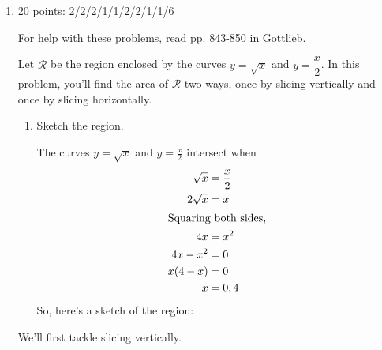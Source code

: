 \documentclass{article}
\begin{document}
\begin{enumerate}


\item
\begin{grading}
    20 points: 2/2/2/1/1/2/2/1/1/6
\end{grading}

For help with these problems, read pp. 843-850 in Gottlieb.

  Let $\mathcal{R}$ be the region enclosed by the curves $y = \sqrt{x}$
  and $y = \dfrac{x}{2}$.  In this problem, you'll find the area of
  $\mathcal{R}$ two ways, once by slicing vertically and once by slicing
  horizontally.

  \begin{enumerate}
  \item
    \begin{problem}[\stretch{3}]
      Sketch the region.
    \end{problem}

    \begin{solution}
      The curves $y = \sqrt{x}$ and $y = \frac{x}{2}$ intersect when
      \begin{align*}
        \sqrt{x} &= \frac{x}{2} \\
        2 \sqrt{x} &= x \\
        \shortintertext{Squaring both sides,}
        4 x &= x^2 \\
        4x - x^2 &= 0 \\
        x (4 - x) &= 0 \\
        x &= 0, 4
      \end{align*}
      So, here's a sketch of the region: 
      \begin{center}
      \end{center}
    \end{solution}

  \end{enumerate}
  We'll first tackle slicing vertically.  
  \begin{enumerate}[resume]


\end{enumerate}
\end{enumerate}
\end{document}
